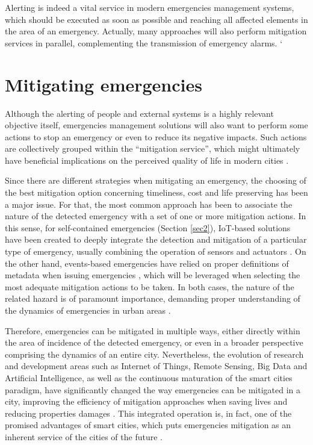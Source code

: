 \begin{refsection}
Alerting is indeed a vital service in modern emergencies management systems, which should be executed as soon as possible and reaching all affected elements in the area of an emergency. Actually, many approaches will also perform mitigation services in parallel, complementing the transmission of emergency alarms.
`

\section {Mitigating emergencies}
\label{sec6}

Although the alerting of people and external systems is a highly relevant objective itself, emergencies management solutions will also want to perform some actions to stop an emergency or even to reduce its negative impacts. Such actions are collectively grouped within the ``mitigation service'', which might ultimately have beneficial implications on the perceived quality of life in modern cities \cite{emergenciesmetric1,smartsensing3}.

Since there are different strategies when mitigating an emergency, the choosing of the best mitigation option concerning timeliness, cost and life preserving has been a major issue. For that, the most common approach has been to associate the nature of the detected emergency with a set of one or more mitigation actions. In this sense, for self-contained emergencies (Section \ref{sec2}), IoT-based solutions have been created to deeply integrate the detection and mitigation of a particular type of emergency, usually combining the operation of sensors and actuators \cite{smartcities2,PlatformsSC}. On the other hand, events-based emergencies have relied on proper definitions of metadata when issuing emergencies \cite{emergenciesmetric2,emergenciesxml2}, which will be leveraged when selecting the most adequate mitigation actions to be taken. In both cases, the nature of the related hazard is of paramount importance, demanding proper understanding of the dynamics of emergencies in urban areas \cite{citiesemergencies1,emergenciesgeneral1}. 

Therefore, emergencies can be mitigated in multiple ways, either directly within the area of incidence of the detected emergency, or even in a broader perspective comprising the dynamics of an entire city. Nevertheless, the evolution of research and development areas such as Internet of Things, Remote Sensing, Big Data and Artificial Intelligence, as well as the continuous maturation of the smart cities paradigm, have significantly changed the way emergencies can be mitigated in a city, improving the efficiency of mitigation approaches when saving lives and reducing properties damages \cite{smartcities1,smartcities2,smartcities3}. This integrated operation is, in fact, one of the promised advantages of smart cities, which puts emergencies mitigation as an inherent service of the cities of the future \cite{smartcities9}. 


\end{refsection}
